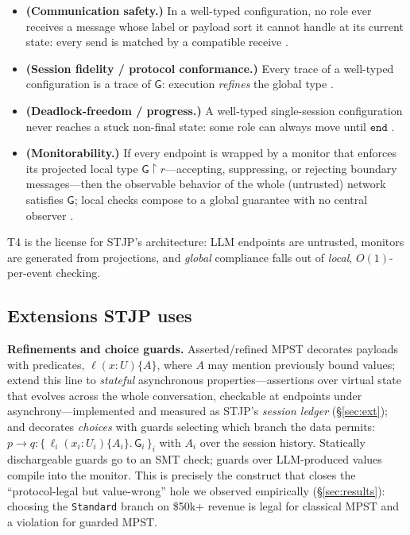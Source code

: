 \documentclass{article}
\newcommand{\gtG}{\mathsf{G}}
\newcommand{\ed}{\mathtt{end}}
\newcommand{\proj}[2]{#1\!\upharpoonright\!#2}
\newcommand{\sends}{\rightarrow}
\newcommand{\lbl}{\ell}
\newcommand{\stjp}{\textsc{STJP}}
\begin{document}
\begin{itemize}\itemsep1pt
\item[\textbf{T1}] \textbf{(Communication safety.)} In a well-typed configuration, no role ever receives a message whose label or payload sort it cannot handle at its current state: every send is matched by a compatible receive \citep{hyc08}.
\item[\textbf{T2}] \textbf{(Session fidelity / protocol conformance.)} Every trace of a well-typed configuration is a trace of $\gtG$: execution \emph{refines} the global type \citep{hyc08,scalas19}.
\item[\textbf{T3}] \textbf{(Deadlock-freedom / progress.)} A well-typed single-session configuration never reaches a stuck non-final state: some role can always move until $\ed$ \citep{hyc08,scalas19}.
\item[\textbf{T4}] \textbf{(Monitorability.)} If every endpoint is wrapped by a monitor that enforces its projected local type $\proj{\gtG}{r}$---accepting, suppressing, or rejecting boundary messages---then the observable behavior of the whole (untrusted) network satisfies $\gtG$; local checks compose to a global guarantee with no central observer \citep{bocchi13}.
\end{itemize}
T4 is the license for \stjp{}'s architecture: LLM endpoints are untrusted, monitors are generated from projections, and \emph{global} compliance falls out of \emph{local}, $O(1)$-per-event checking.

\subsection{Extensions \stjp{} uses}
\textbf{Refinements and choice guards.} Asserted/refined MPST \citep{bocchi10,refine24} decorates payloads with predicates, $\lbl(x{:}U)\{A\}$, where $A$ may mention previously bound values; \citet{chen12} extend this line to \emph{stateful} asynchronous properties---assertions over virtual state that evolves across the whole conversation, checkable at endpoints under asynchrony---implemented and measured as \stjp{}'s \emph{session ledger} (\S\ref{sec:ext}); and decorates \emph{choices} with guards selecting which branch the data permits:
$p \sends q : \{\,\lbl_i(x_i{:}U_i)\{A_i\}.\,\gtG_i\,\}_{i}$ with $A_i$ over the session history. Statically dischargeable guards go to an SMT check; guards over LLM-produced values compile into the monitor. This is precisely the construct that closes the ``protocol-legal but value-wrong'' hole we observed empirically (\S\ref{sec:results}): choosing the \texttt{Standard} branch on \$50k+ revenue is legal for classical MPST and a violation for guarded MPST.
\end{document}

